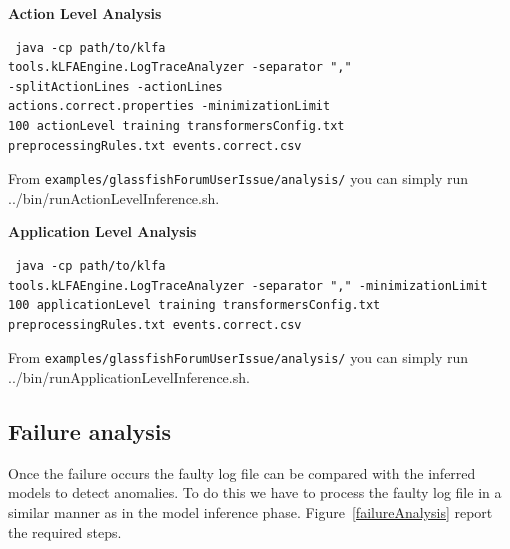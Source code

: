 \textbf{Action Level Analysis}

\begin{verbatim}
 java -cp path/to/klfa
tools.kLFAEngine.LogTraceAnalyzer -separator ","
-splitActionLines -actionLines
actions.correct.properties -minimizationLimit
100 actionLevel training transformersConfig.txt
preprocessingRules.txt events.correct.csv
\end{verbatim}

From \texttt{examples/glassfishForumUserIssue/analysis/} you can simply run
../bin/runActionLevelInference.sh.

\textbf{Application Level Analysis}

\begin{verbatim}
 java -cp path/to/klfa
tools.kLFAEngine.LogTraceAnalyzer -separator "," -minimizationLimit
100 applicationLevel training transformersConfig.txt
preprocessingRules.txt events.correct.csv
\end{verbatim}

From \texttt{examples/glassfishForumUserIssue/analysis/} you can simply run
../bin/runApplicationLevelInference.sh.

\subsection{Failure analysis}

Once the failure occurs the faulty log file can be compared with the
inferred models to detect anomalies. To do this we have to process the
faulty log file in a similar manner as in the model inference phase.
Figure~\ref{failureAnalysis} report the required steps.

